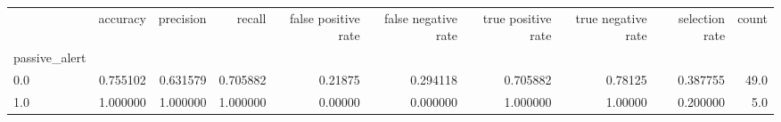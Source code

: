 \begin{tabular}{lrrrrrrrrr}
\toprule
{} &  accuracy &  precision &    recall &  false positive rate &  false negative rate &  true positive rate &  true negative rate &  selection rate &  count \\
passive\_alert &           &            &           &                      &                      &                     &                     &                 &        \\
\midrule
0.0           &  0.755102 &   0.631579 &  0.705882 &              0.21875 &             0.294118 &            0.705882 &             0.78125 &        0.387755 &   49.0 \\
1.0           &  1.000000 &   1.000000 &  1.000000 &              0.00000 &             0.000000 &            1.000000 &             1.00000 &        0.200000 &    5.0 \\
\bottomrule
\end{tabular}
